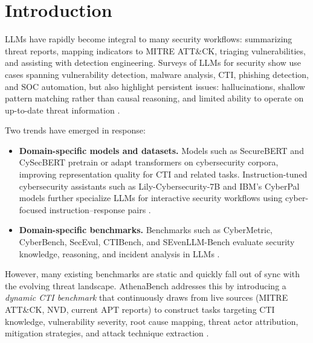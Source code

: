 \documentclass[unnumsec,webpdf,contemporary,large]{oup-authoring-template}
\theoremstyle{thmstyleone}
\theoremstyle{thmstyletwo}
\theoremstyle{thmstylethree}
\begin{document}


\maketitle

\section{Introduction}

LLMs have rapidly become integral to many security workflows: summarizing threat reports, mapping indicators to MITRE ATT\&CK, triaging vulnerabilities, and assisting with detection engineering. Surveys of LLMs for security show use cases spanning vulnerability detection, malware analysis, CTI, phishing detection, and SOC automation, but also highlight persistent issues: hallucinations, shallow pattern matching rather than causal reasoning, and limited ability to operate on up-to-date threat information \cite{levi2024cyberpal,liu2024cyberbench}.

Two trends have emerged in response:

\begin{itemize}
  \item \textbf{Domain-specific models and datasets.} Models such as SecureBERT and CySecBERT pretrain or adapt transformers on cybersecurity corpora, improving representation quality for CTI and related tasks. Instruction-tuned cybersecurity assistants such as Lily-Cybersecurity-7B and IBM's CyberPal models further specialize LLMs for interactive security workflows using cyber-focused instruction--response pairs \cite{levi2024cyberpal}.
  \item \textbf{Domain-specific benchmarks.} Benchmarks such as CyberMetric, CyberBench, SecEval, CTIBench, and SEvenLLM-Bench evaluate security knowledge, reasoning, and incident analysis in LLMs \cite{alam2024ctibench,ji2024sevenllm,liu2024cyberbench}.
\end{itemize}

However, many existing benchmarks are static and quickly fall out of sync with the evolving threat landscape. AthenaBench addresses this by introducing a \emph{dynamic CTI benchmark} that continuously draws from live sources (MITRE ATT\&CK, NVD, current APT reports) to construct tasks targeting CTI knowledge, vulnerability severity, root cause mapping, threat actor attribution, mitigation strategies, and attack technique extraction \cite{alam2025athenabench}.
\end{document}
